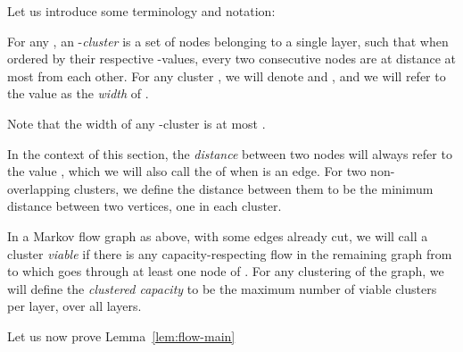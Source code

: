 Let us introduce some terminology and notation:

\begin{definition} For any , an -\emph{cluster} is a set of nodes belonging to a single layer, such that when ordered by their respective -values, every two consecutive nodes are at distance at most  from each other. For any cluster , we will denote  and , and we will refer to the value  as the \emph{width} of .
\end{definition}

Note that the width of any -cluster is at most .

\begin{definition} In the context of this section, the \emph{distance} between two nodes  will always refer to the value , which we will also call the  of  when  is an edge. For two non-overlapping clusters, we define the distance between them to be the minimum distance between two vertices, one in each cluster.
\end{definition}

\begin{definition} In a Markov flow graph as above, with some edges already cut, we will call a cluster  \emph{viable} if there is any capacity-respecting flow in the remaining graph from  to  which goes through at least one node of . For any clustering of the graph, we will define the \emph{clustered capacity} to be the maximum number of viable clusters per layer, over all layers.
\end{definition}

Let us now prove Lemma~\ref{lem:flow-main}

